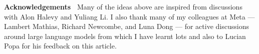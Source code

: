 \documentclass[11pt,dvipdfm]{article}
\begin{document}
\medskip
\noindent
{\bf Acknowledgements~} Many of the ideas above are inspired from discussions with Alon Halevy and Yuliang Li. I also thank many of my colleagues at Meta --- Lambert Mathias, Richard Newcombe, and Luna Dong --- for active discussions around large language models from which I have learnt lots and also to Lucian Popa for his feedback on this article.

\small


\end{document}
